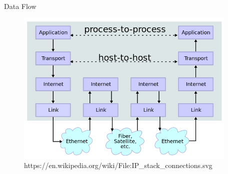\begin{frame}{Data Flow}
	\begin{figure}
		\includegraphics[width=300pt]{../common/images/IP_stack_connections_flow.png}\\
		{\scriptsize https://en.wikipedia.org/wiki/File:IP\_stack\_connections.svg}
	\end{figure}
\end{frame}

